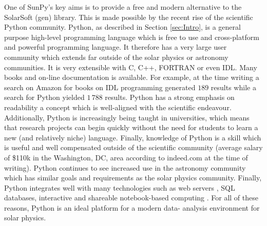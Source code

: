 One of SunPy's key aims is to provide a free and modern alternative to the 
SolarSoft (gen) library. This is made possible by the recent rise of the 
scientific Python community. Python, as described in Section \ref{sec:Intro}, 
is a general purpose high-level programming language which is free to use and 
cross-platform and powerful programming language.
It therefore has a very large user community which extends far outside of the 
solar physics or astronomy communities. It is very extensible with C, C++, 
FORTRAN or even IDL. Many books and on-line documentation is available. For 
example, at the time writing a search 
%
% 
on Amazon for books on IDL programming generated $189$ results while a search 
for Python yielded $1\,788$ results. Python has a strong emphasis on 
readability a concept which is well-aligned with the scientific endeavour.
Additionally, Python is increasingly being taught in universities, which means 
that research projects can begin quickly without the need for students to learn 
a new (and relatively niche) language. Finally, knowledge of Python is a skill 
which is useful and well compensated outside of the scientific community 
(average salary of \$110k in the Washington, DC, area according to indeed.com at 
the time of writing). Python continues to see increased use in the astronomy 
community \citep{greenfield2011} which has similar goals and requirements as 
the solar physics community. Finally, Python integrates well with many 
technologies such as web servers \citep{dolgert2008}, SQL databases, 
interactive and shareable notebook-based computing \citep{perez2007}. For all 
of these reasons, Python is an ideal platform for a modern data-
analysis environment for solar physics.

